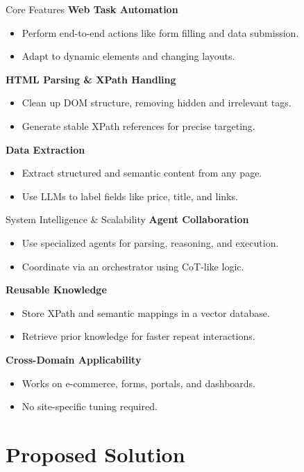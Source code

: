 \documentclass{beamer}
\begin{document}
\begin{frame}{Core Features}
\textbf{Web Task Automation}
\begin{itemize}
  \item Perform end-to-end actions like form filling and data submission.
  \item Adapt to dynamic elements and changing layouts.
\end{itemize}

\textbf{HTML Parsing \& XPath Handling}
\begin{itemize}
  \item Clean up DOM structure, removing hidden and irrelevant tags.
  \item Generate stable XPath references for precise targeting.
\end{itemize}

\textbf{Data Extraction}
\begin{itemize}
  \item Extract structured and semantic content from any page.
  \item Use LLMs to label fields like price, title, and links.
\end{itemize}
\end{frame}

\begin{frame}{System Intelligence \& Scalability}
\textbf{Agent Collaboration}
\begin{itemize}
  \item Use specialized agents for parsing, reasoning, and execution.
  \item Coordinate via an orchestrator using CoT-like logic.
\end{itemize}

\textbf{Reusable Knowledge}
\begin{itemize}
  \item Store XPath and semantic mappings in a vector database.
  \item Retrieve prior knowledge for faster repeat interactions.
\end{itemize}

\textbf{Cross-Domain Applicability}
\begin{itemize}
  \item Works on e-commerce, forms, portals, and dashboards.
  \item No site-specific tuning required.
\end{itemize}
\end{frame}


\section{Proposed Solution}
\end{document}
